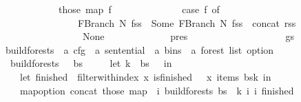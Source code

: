 \begin{isabellebody}
\ \ \ \ \ \ \ \ \ \ \ \ those\ {\isacharparenleft}{\kern0pt}map\ {\isacharparenleft}{\kern0pt}{\isasymlambda}f{\isachardot}{\kern0pt}\isanewline
\ \ \ \ \ \ \ \ \ \ \ \ \ \ case\ f\ of\isanewline
\ \ \ \ \ \ \ \ \ \ \ \ \ \ \ \ FBranch\ N\ fss\ {\isasymRightarrow}\ Some\ {\isacharparenleft}{\kern0pt}FBranch\ N\ {\isacharparenleft}{\kern0pt}fss\ {\isacharat}{\kern0pt}\ {\isacharbrackleft}{\kern0pt}concat\ rss{\isacharbrackright}{\kern0pt}{\isacharparenright}{\kern0pt}{\isacharparenright}{\kern0pt}\isanewline
\ \ \ \ \ \ \ \ \ \ \ \ \ \ {\isacharbar}{\kern0pt}\ {\isacharunderscore}{\kern0pt}\ {\isasymRightarrow}\ None\isanewline
\ \ \ \ \ \ \ \ \ \ \ \ {\isacharparenright}{\kern0pt}\ pres{\isacharparenright}{\kern0pt}\isanewline
\ \ \ \ \ \ \ \ \ \ {\isacharbraceright}{\kern0pt}\isanewline
\ \ \ \ \ \ \ \ {\isacharparenright}{\kern0pt}\ gs{\isacharparenright}{\kern0pt}{\isacharparenright}{\kern0pt}\isanewline
\ \ \ \ \ \ {\isacharparenright}{\kern0pt}\isanewline
\ \ {\isacharparenright}{\kern0pt}{\isacharparenright}{\kern0pt}{\isachardoublequoteclose}\isanewline
\isanewline
{}\isamarkupfalse%
\ build{\isacharunderscore}{\kern0pt}forests\ {\isacharcolon}{\kern0pt}{\isacharcolon}{\kern0pt}\ {\isachardoublequoteopen}{\isacharprime}{\kern0pt}a\ cfg\ {\isasymRightarrow}\ {\isacharprime}{\kern0pt}a\ sentential\ {\isasymRightarrow}\ {\isacharprime}{\kern0pt}a\ bins\ {\isasymRightarrow}\ {\isacharprime}{\kern0pt}a\ forest\ list\ option{\isachardoublequoteclose}\ \isanewline
\ \ {\isachardoublequoteopen}build{\isacharunderscore}{\kern0pt}forests\ {\isasymG}\ {\isasymomega}\ bs\ {\isasymequiv}\isanewline
\ \ \ \ let\ k\ {\isacharequal}{\kern0pt}\ {\isacharbar}{\kern0pt}bs{\isacharbar}{\kern0pt}\ {\isacharminus}{\kern0pt}\ {}\ in\isanewline
\ \ \ \ let\ finished\ {\isacharequal}{\kern0pt}\ filter{\isacharunderscore}{\kern0pt}with{\isacharunderscore}{\kern0pt}index\ {\isacharparenleft}{\kern0pt}{\isasymlambda}x{\isachardot}{\kern0pt}\ is{\isacharunderscore}{\kern0pt}finished\ {\isasymG}\ {\isasymomega}\ x{\isacharparenright}{\kern0pt}\ {\isacharparenleft}{\kern0pt}items\ {\isacharparenleft}{\kern0pt}bs{\isacharbang}{\kern0pt}k{\isacharparenright}{\kern0pt}{\isacharparenright}{\kern0pt}\ in\isanewline
\ \ \ \ map{\isacharunderscore}{\kern0pt}option\ concat\ {\isacharparenleft}{\kern0pt}those\ {\isacharparenleft}{\kern0pt}map\ {\isacharparenleft}{\kern0pt}{\isasymlambda}{\isacharparenleft}{\kern0pt}{\isacharunderscore}{\kern0pt}{\isacharcomma}{\kern0pt}\ i{\isacharparenright}{\kern0pt}{\isachardot}{\kern0pt}\ build{\isacharunderscore}{\kern0pt}forests{\isacharprime}{\kern0pt}\ bs\ {\isasymomega}\ k\ i\ {\isacharbraceleft}{\kern0pt}i{\isacharbraceright}{\kern0pt}{\isacharparenright}{\kern0pt}\ finished{\isacharparenright}{\kern0pt}{\isacharparenright}{\kern0pt}{\isachardoublequoteclose}%

\end{isabellebody}

